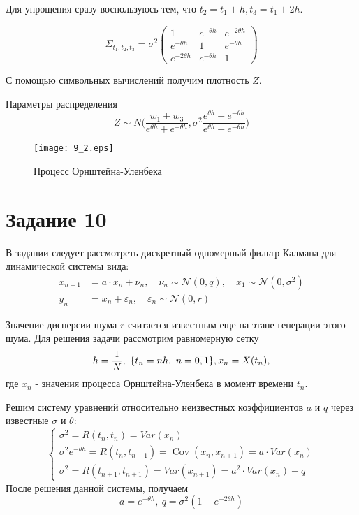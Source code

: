 \documentclass[11pt]{article}
\begin{document}
Для упрощения сразу воспользуюсь тем, что $t_2 = t_1 + h, t_3 = t_1 + 2h$.  

$$
\Sigma_{t_1,t_2, t_3} = \sigma^2
\begin{pmatrix}
1 & e^{-\theta h} & e^{-2\theta h} \\
e^{-\theta h} & 1 & e^{-\theta h} \\
e^{-2\theta h} & e^{-\theta h} & 1
\end{pmatrix}
$$

С помощью символьных вычислений получим плотность $Z$. 

Параметры распределения 
$$
    Z \sim N \Big(\frac{w_1 + w_3}{e^{\theta h} + e^{-\theta h}}, \sigma^2 \frac{e^{\theta h} - e^{-\theta h}}{e^{\theta h} + e^{-\theta h}} \Big)
$$

\begin{figure}[ht]
    \texttt{[image: 9\_2.eps]} 
    \caption{Процесс Орнштейна-Уленбека}
\end{figure} 
\FloatBarrier


\section{Задание 10}

В задании следует рассмотреть дискретный одномерный фильтр Калмана для динамической системы вида:
$$
\begin{aligned}
x_{n+1} & =a \cdot x_n+\nu_n, \quad \nu_n \sim \mathcal{N}(0, q), \quad x_1 \sim \mathcal{N}\left(0, \sigma^2\right) \\
y_n & =x_n+\varepsilon_n, \quad \varepsilon_n \sim \mathcal{N}(0, r)
\end{aligned}
$$

Значение дисперсии шума $r$ считается известным еще на этапе генерации этого шума.
Для решения задачи рассмотрим равномерную сетку
$$
    h = \frac{1}{N},~ \{t_n = nh,~ n=\overline{0,1} \}, \\
    x_n = X(t_n),
$$
где $x_n$ - значения процесса Орнштейна-Уленбека в момент времени $t_n$.

Решим систему уравнений относительно неизвестных коэффициентов $a$ и $q$ через известные $\sigma$ и $\theta$:
$$
\left\{
    \begin{array}{l}
    \sigma^2=R\left(t_n, t_n\right)=Var\left(x_n\right) \\
    \sigma^2 e^{-\theta h}=R\left(t_n, t_{n+1}\right)=\operatorname{Cov}\left(x_n, x_{n+1}\right)=a \cdot Var\left(x_n\right) \\
    \sigma^2=R\left(t_{n+1}, t_{n+1}\right)=Var\left(x_{n+1}\right)=a^2 \cdot Var\left(x_n\right)+q
    \end{array}\right.
$$
После решения данной системы, получаем
$$
    a = e^{- \theta h},~ q= \sigma^2(1 - e^{-2 \theta h})
$$
\end{document}
